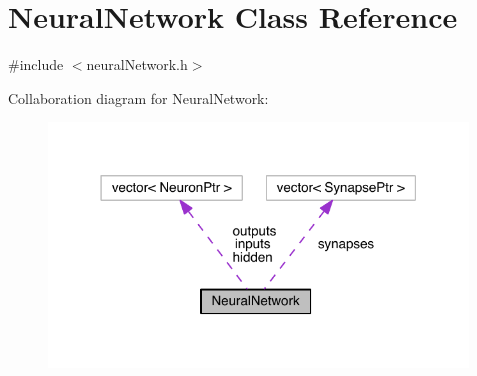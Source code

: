 \hypertarget{class_neural_network}{}\section{Neural\+Network Class Reference}
\label{class_neural_network}


{\ttfamily \#include $<$neural\+Network.\+h$>$}



Collaboration diagram for Neural\+Network\+:\nopagebreak
\begin{figure}[H]
\begin{center}
\leavevmode
\includegraphics[width=316pt]{class_neural_network__coll__graph}
\end{center}
\end{figure}
